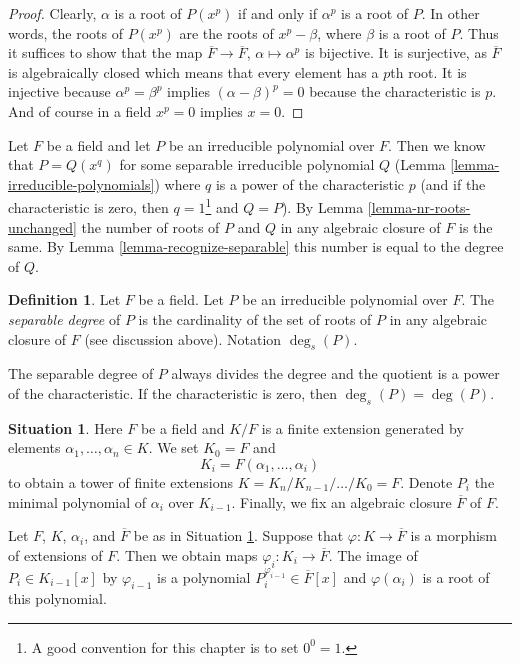 \documentclass{stacks-project}
\theoremstyle{plain}
\theoremstyle{definition}
\newtheorem{definition}[subsection]{Definition}
\newtheorem{situation}[subsection]{Situation}
\theoremstyle{remark}
\numberwithin{equation}{subsection}
\begin{document}
\begin{proof}
Clearly, $\alpha$ is a root of $P(x^p)$ if and only if $\alpha^p$ is a
root of $P$. In other words, the roots of $P(x^p)$ are the roots of
$x^p - \beta$, where $\beta$ is a root of $P$. Thus it suffices to show
that the map $\overline{F} \to \overline{F}$, $\alpha \mapsto \alpha^p$
is bijective. It is surjective, as $\overline{F}$ is algebraically closed
which means that every element has a $p$th root. It is injective because
$\alpha^p = \beta^p$ implies $(\alpha - \beta)^p = 0$ because
the characteristic is $p$. And of course in a field $x^p = 0$ implies
$x = 0$.
\end{proof}

\noindent
Let $F$ be a field and let $P$ be an irreducible polynomial over $F$.
Then we know that $P = Q(x^q)$ for some separable irreducible polynomial $Q$
(Lemma \ref{lemma-irreducible-polynomials}) where $q$ is a power of
the characteristic $p$ (and if the characteristic is zero, then
$q = 1$\footnote{A good convention for this chapter is to set $0^0 = 1$.}
and $Q = P$). By Lemma \ref{lemma-nr-roots-unchanged} the number of
roots of $P$ and $Q$ in any algebraic closure of $F$ is the same.
By Lemma \ref{lemma-recognize-separable} this number is equal to the degree
of $Q$.

\begin{definition}
\label{definition-separable-degree}
Let $F$ be a field. Let $P$ be an irreducible polynomial over $F$.
The {\it separable degree} of $P$ is the cardinality of the
set of roots of $P$ in any algebraic closure of $F$ (see discussion
above). Notation $\deg_s(P)$.
\end{definition}

\noindent
The separable degree of $P$ always divides the degree and the quotient
is a power of the characteristic. If the characteristic is zero, then
$\deg_s(P) = \deg(P)$.

\begin{situation}
\label{situation-finitely-generated}
Here $F$ be a field and $K/F$ is a finite extension generated by elements
$\alpha_1, \ldots, \alpha_n \in K$. We set $K_0 = F$ and
$$
K_i = F(\alpha_1, \ldots, \alpha_i)
$$
to obtain a tower of finite extensions
$K = K_n / K_{n - 1} / \ldots / K_0 = F$.
Denote $P_i$ the minimal polynomial of $\alpha_i$ over $K_{i - 1}$.
Finally, we fix an algebraic closure $\overline{F}$ of $F$.
\end{situation}

\noindent
Let $F$, $K$, $\alpha_i$, and $\overline{F}$ be as in
Situation \ref{situation-finitely-generated}.
Suppose that $\varphi : K \to \overline{F}$ is a morphism of extensions
of $F$. Then we obtain maps $\varphi_i : K_i \to \overline{F}$.
The image of $P_i \in K_{i - 1}[x]$ by $\varphi_{i - 1}$
is a polynomial $P_i^{\varphi_{i - 1}} \in \overline{F}[x]$
and $\varphi(\alpha_i)$ is a root of this polynomial.
\end{document}
